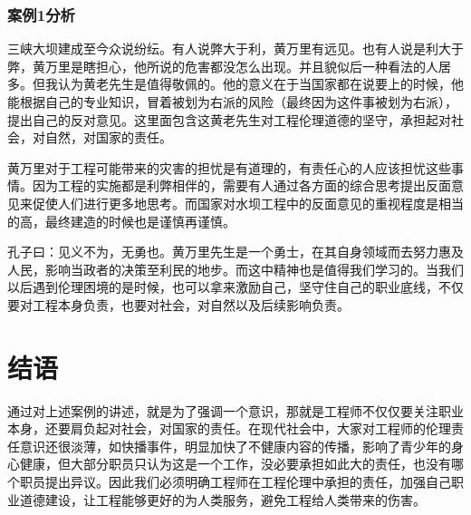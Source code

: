 \documentclass[a4paper,12pt]{ctexart}
\begin{document}
\subsubsection{案例1分析}
三峡大坝建成至今众说纷纭。有人说弊大于利，黄万里有远见。也有人说是利大于弊，黄万里是瞎担心，他所说的危害都没怎么出现。并且貌似后一种看法的人居多。但我认为黄老先生是值得敬佩的。他的意义在于当国家都在说要上的时候，他能根据自己的专业知识，冒着被划为右派的风险（最终因为这件事被划为右派），提出自己的反对意见。这里面包含这黄老先生对工程伦理道德的坚守，承担起对社会，对自然，对国家的责任。

黄万里对于工程可能带来的灾害的担忧是有道理的，有责任心的人应该担忧这些事情。因为工程的实施都是利弊相伴的，需要有人通过各方面的综合思考提出反面意见来促使人们进行更多地思考。而国家对水坝工程中的反面意见的重视程度是相当的高，最终建造的时候也是谨慎再谨慎。

孔子曰：见义不为，无勇也。黄万里先生是一个勇士，在其自身领域而去努力惠及人民，影响当政者的决策至利民的地步。而这中精神也是值得我们学习的。当我们以后遇到伦理困境的是时候，也可以拿来激励自己，坚守住自己的职业底线，不仅要对工程本身负责，也要对社会，对自然以及后续影响负责。



\section{结语}

通过对上述案例的讲述，就是为了强调一个意识，那就是工程师不仅仅要关注职业本身，还要肩负起对社会，对国家的责任。在现代社会中，大家对工程师的伦理责任意识还很淡薄，如快播事件，明显加快了不健康内容的传播，影响了青少年的身心健康，但大部分职员只认为这是一个工作，没必要承担如此大的责任，也没有哪个职员提出异议。因此我们必须明确工程师在工程伦理中承担的责任，加强自己职业道德建设，让工程能够更好的为人类服务，避免工程给人类带来的伤害。
\end{document}
